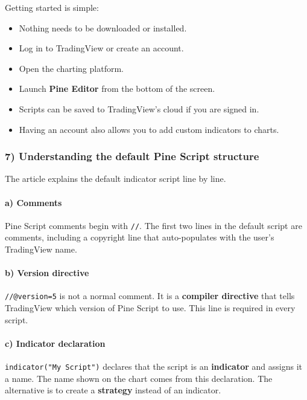 \documentclass[12pt,openany]{book}
\begin{document}
Getting started is simple:

\begin{itemize}[leftmargin=*]
    \item Nothing needs to be downloaded or installed.
    \item Log in to TradingView or create an account.
    \item Open the charting platform.
    \item Launch \textbf{Pine Editor} from the bottom of the screen.
    \item Scripts can be saved to TradingView's cloud if you are signed in.
    \item Having an account also allows you to add custom indicators to charts.
\end{itemize}

\subsubsection{7) Understanding the default Pine Script structure}

The article explains the default indicator script line by line.

\paragraph{a) Comments}

Pine Script comments begin with \texttt{//}. The first two lines in the default script are comments, including a copyright line that auto-populates with the user's TradingView name.

\paragraph{b) Version directive}

\texttt{//@version=5} is not a normal comment. It is a \textbf{compiler directive} that tells TradingView which version of Pine Script to use. This line is required in every script.

\paragraph{c) Indicator declaration}

\texttt{indicator("My Script")} declares that the script is an \textbf{indicator} and assigns it a name. The name shown on the chart comes from this declaration. The alternative is to create a \textbf{strategy} instead of an indicator.
\end{document}
